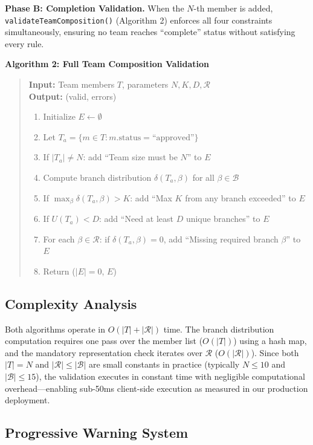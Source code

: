 \documentclass[12pt,a4paper]{article}
\begin{document}
\textbf{Phase B: Completion Validation.} When the $N$-th member is added, \texttt{validateTeamComposition()} (Algorithm 2) enforces all four constraints simultaneously, ensuring no team reaches ``complete'' status without satisfying every rule.

\textbf{Algorithm 2: Full Team Composition Validation}

\begin{quote}
\textbf{Input:} Team members $T$, parameters $N, K, D, \mathcal{R}$\\
\textbf{Output:} (valid, errors)

\begin{enumerate}[noitemsep]
    \item Initialize $E \gets \emptyset$
    \item Let $T_a = \{m \in T : m.\text{status} = \text{``approved''}\}$
    \item If $|T_a| \neq N$: add ``Team size must be $N$'' to $E$
    \item Compute branch distribution $\delta(T_a, \beta)$ for all $\beta \in \mathcal{B}$
    \item If $\max_\beta \delta(T_a, \beta) > K$: add ``Max $K$ from any branch exceeded'' to $E$
    \item If $U(T_a) < D$: add ``Need at least $D$ unique branches'' to $E$
    \item For each $\beta \in \mathcal{R}$: if $\delta(T_a, \beta) = 0$, add ``Missing required branch $\beta$'' to $E$
    \item Return ($|E| = 0$, $E$)
\end{enumerate}
\end{quote}

\subsection{Complexity Analysis}

Both algorithms operate in $O(|T| + |\mathcal{R}|)$ time. The branch distribution computation requires one pass over the member list ($O(|T|)$) using a hash map, and the mandatory representation check iterates over $\mathcal{R}$ ($O(|\mathcal{R}|)$). Since both $|T| = N$ and $|\mathcal{R}| \leq |\mathcal{B}|$ are small constants in practice (typically $N \leq 10$ and $|\mathcal{B}| \leq 15$), the validation executes in constant time with negligible computational overhead---enabling sub-50ms client-side execution as measured in our production deployment.

\subsection{Progressive Warning System}
\end{document}
